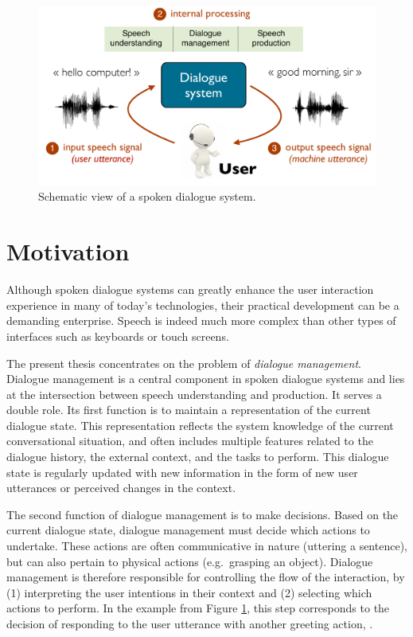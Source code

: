 \begin{figure}[h]
\center
\includegraphics[scale=0.46]{imgs/basicsds.pdf}
\caption{Schematic view of a spoken dialogue system.}
\label{fig:basicsds}
\end{figure}

\section{Motivation}

Although spoken dialogue systems can greatly enhance the user interaction experience in many of today's technologies, their practical development can be a demanding enterprise. Speech is indeed much more complex than other types of interfaces such as keyboards or touch screens.  

The present thesis concentrates on the problem of \textit{dialogue management}.  Dialogue management is a central component in spoken dialogue systems and lies at the intersection between speech understanding and production.  It serves a double role. Its first function is to maintain a representation of the current dialogue state. This representation reflects the system knowledge of the current conversational situation, and often includes multiple features related to the dialogue history, the external context, and the tasks to perform.  This dialogue state is regularly updated with new information in the form of new user utterances or perceived changes in the context. 

The second function of dialogue management is to make decisions.  Based on the current dialogue state, dialogue management must decide which actions to undertake. These actions are often communicative in nature (uttering a sentence), but can also pertain to physical actions (e.g.\ grasping an object).  Dialogue management is therefore responsible for controlling the flow of the interaction, by (1) interpreting the user intentions in their context and (2) selecting which actions to perform. In the example from Figure \ref{fig:basicsds}, this step corresponds to the decision of responding to the user utterance  with another greeting action, . 

